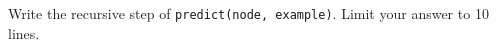 \begin{parts}
\begin{subparts}
\begin{your_solution}[title=Your Answer,height=7.05cm]
    \begin{your_code_solution}
    \end{your_code_solution}

    \end{your_solution}
    
    \subpart[3] Write the recursive step of \texttt{predict(node, example)}.  Limit your answer to 10 lines. \\
    \begin{your_solution}[title=Your Answer,height=7.05cm]
        
    \begin{your_code_solution}
    \end{your_code_solution}
        
    \end{your_solution}
    \end{subparts}
\end{parts}